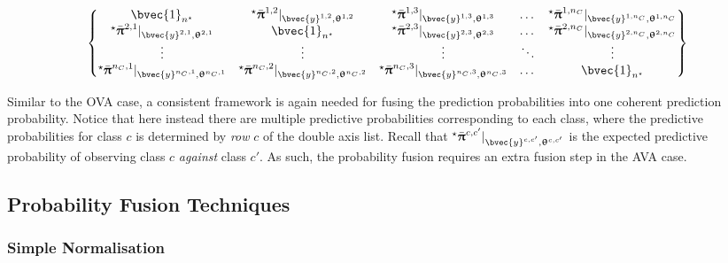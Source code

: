 				\begin{equation}
					\begin{Bmatrix*}
						\bvec{1}_{n^{\star}} & {^{\star}}\bar{\vec{\uppi}}^{1, 2} |_{\bvec{y}^{1, 2}, \vec{\uptheta}^{1, 2}} & {^{\star}}\bar{\vec{\uppi}}^{1, 3} |_{\bvec{y}^{1, 3}, \vec{\uptheta}^{1, 3}} & \dots & {^{\star}}\bar{\vec{\uppi}}^{1, n_{C}} |_{\bvec{y}^{1, n_{C}}, \vec{\uptheta}^{1, n_{C}}} \\
						{^{\star}}\bar{\vec{\uppi}}^{2, 1} |_{\bvec{y}^{2, 1}, \vec{\uptheta}^{2, 1}} & \bvec{1}_{n^{\star}} & {^{\star}}\bar{\vec{\uppi}}^{2, 3} |_{\bvec{y}^{2, 3}, \vec{\uptheta}^{2, 3}} & \dots & {^{\star}}\bar{\vec{\uppi}}^{2, n_{C}} |_{\bvec{y}^{2, n_{C}}, \vec{\uptheta}^{2, n_{C}}} \\
						\vdots & \vdots & \vdots & \ddots & \vdots \\
						{^{\star}}\bar{\vec{\uppi}}^{n_{C}, 1} |_{\bvec{y}^{n_{C}, 1}, \vec{\uptheta}^{n_{C}, 1}} & {^{\star}}\bar{\vec{\uppi}}^{n_{C}, 2} |_{\bvec{y}^{n_{C}, 2}, \vec{\uptheta}^{n_{C}, 2}} & {^{\star}}\bar{\vec{\uppi}}^{n_{C}, 3} |_{\bvec{y}^{n_{C}, 3}, \vec{\uptheta}^{n_{C}, 3}} & \dots & \bvec{1}_{n^{\star}}
					\end{Bmatrix*} 
				\label{Equation:ProbabilityListAVAfull}
				\end{equation}	
				
				Similar to the OVA case, a consistent framework is again needed for fusing the prediction probabilities into one coherent prediction probability. Notice that here instead there are multiple predictive probabilities corresponding to each class, where the predictive probabilities for class $c$ is determined by \textit{row} $c$ of the double axis list. Recall that ${^{\star}}\bar{\vec{\uppi}}^{c, c'} |_{\bvec{y}^{c, c'}, \vec{\uptheta}^{c, c'}}$ is the expected predictive probability of observing class $c$ \textit{against} class $c'$. As such, the probability fusion requires an extra fusion step in the AVA case.
			
		\subsection{Probability Fusion Techniques}
		\label{BenthicHabitatMapping:Classification:ProbabilityFusion}
		
			
			\subsubsection{Simple Normalisation}
			\label{BenthicHabitatMapping:Classification:ProbabilityFusion:SimpleNormalisation}
				
